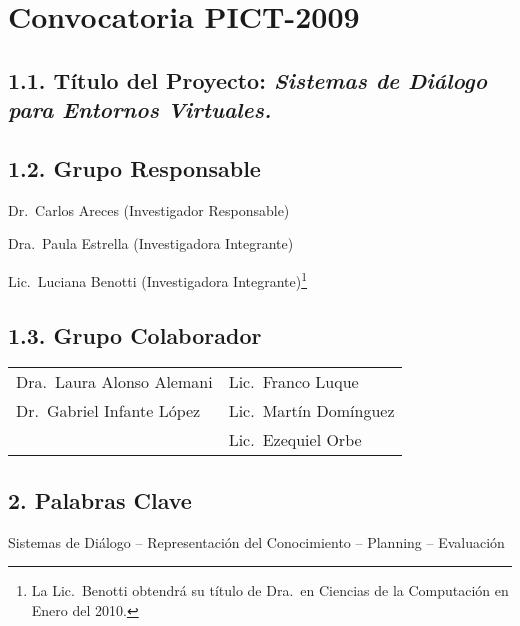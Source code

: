 \documentclass[11pt]{article}
\newcommand{\MySubSection}[1]{\vspace*{-.1\baselineskip}%
\subsection*{\sffamily\textbf
#1}\vspace*{-.2\baselineskip}}
\begin{document}
%
\thispagestyle{plain}



\section*{\sffamily\textbf{Convocatoria PICT-2009}}
\mbox{}

\vspace*{-.5\baselineskip}
\MySubSection{1.1. T\'itulo del Proyecto:
{\rm \emph{\Large Sistemas de Di\'alogo para Entornos Virtuales.}}}

\MySubSection{1.2. Grupo Responsable}

\hspace*{.5cm}
Dr.\ Carlos Areces (Investigador Responsable)

Dra.\ Paula Estrella (Investigadora Integrante)

Lic.\ Luciana Benotti (Investigadora Integrante)\footnote{La Lic.\ Benotti
obtendr\'a su t\'itulo de Dra.\ en Ciencias de la Computaci\'on en Enero del 2010.}

\MySubSection{1.3. Grupo Colaborador}

\hspace*{.5cm}
\begin{tabular}{@{}l@{\ \ \ \ \ \ \ \ \ \ }l}
Dra.\ Laura Alonso Alemani &

Lic.\ Franco Luque \\

Dr.\ Gabriel Infante L\'opez &

Lic.\ Mart\'in Dom\'inguez \\

& Lic.\ Ezequiel Orbe
\end{tabular}


\MySubSection{2.  Palabras Clave}

Sistemas de Di\'alogo -- Representaci\'on del Conocimiento -- Planning
-- Evaluaci\'on





\end{document}
